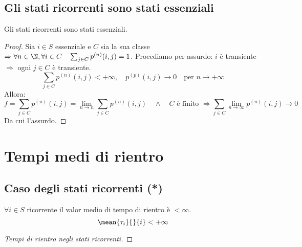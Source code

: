 \documentclass[\main/main.tex]{subfiles}
\begin{document}
\subsection{Gli stati ricorrenti sono stati essenziali}
\begin{theorem}[Stati ricorrenti = stati essenziali]
  Gli stati ricorrenti sono stati essenziali.
\end{theorem}
\begin{proof}
  Sia \(i \in S\) essenziale e \(C\) sia la sua classe \(\Rightarrow \forall n \in \N, \forall i \in C \quad \sum_{j \in C} p^{(n)}(i,j) = 1\). Procediamo per assurdo: \(i\) è transiente \(\Rightarrow \) ogni \(j \in C\) è transiente.
  \[
    \sum_{j \in C} p^{(n)}(i,j) < + \infty,\quad p^{(p)}(i,j) \rightarrow 0 \quad \text{per } n \rightarrow + \infty
  \]
  Allora:
  \[
    f = \sum_{j \in C} p^{(n)}(i,j) = \lim_{n \rightarrow n} \sum_{j \in C} p^{(n)}(i,j) \quad \land \quad C \text{ è finito }\Rightarrow \sum_{j \in C} \lim_{n\rightarrow \infty} p^{(n)} (i,j) \rightarrow 0
  \]
  Da cui l'assurdo.
\end{proof}
\section{Tempi medi di rientro}
\subsection{Caso degli stati ricorrenti (*)}
\begin{theorem}
  \(\forall i \in S\) ricorrente il valor medio di tempo di rientro è \(< \infty\).
  \[
    \mean{\tau_i}{}{i} < + \infty
  \]
\end{theorem}
\begin{proof}[Tempi di rientro negli stati ricorrenti]

\end{proof}
\end{document}
